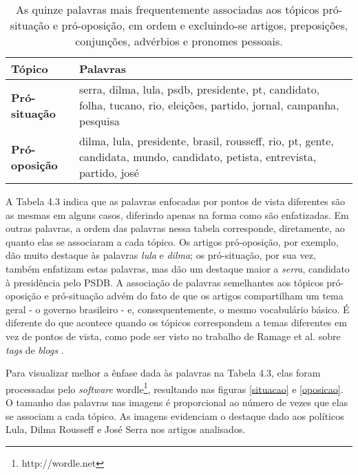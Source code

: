 \begin{table}[h]
\centering
\begin{tabular}{| l | p{10cm} | }
\hline
\textbf{Tópico} & \textbf{Palavras} \\ \hline
\textbf{Pró-situação} & serra, dilma, lula, psdb, presidente, pt, candidato, folha, tucano, rio, eleições, partido, jornal, campanha, pesquisa \\ \hline
\textbf{Pró-oposição} & dilma, lula, presidente, brasil, rousseff, rio, pt, gente, candidata, mundo, candidato, petista, entrevista, partido, josé \\ \hline
\end{tabular}
\label{tab:palavras}
\caption{As quinze palavras mais frequentemente associadas aos tópicos pró-situação e pró-oposição, em ordem e excluindo-se artigos, preposições, conjunções, advérbios e pronomes pessoais.}
\end{table}


A Tabela 4.3 indica que as palavras enfocadas por pontos de vista diferentes são as mesmas em alguns casos, diferindo apenas na forma como são enfatizadas. Em outras palavras, a ordem das palavras nessa tabela corresponde, diretamente, ao quanto elas se associaram a cada tópico. Os artigos pró-oposição, por exemplo, dão muito destaque às palavras \emph{lula} e \emph{dilma}; os pró-situação, por sua vez, também enfatizam estas palavras, mas dão um destaque maior a \emph{serra}, candidato à presidência pelo PSDB. A associação de palavras semelhantes aos tópicos pró-oposição e pró-situação advém do fato de que os artigos compartilham um tema geral - o governo brasileiro - e, consequentemente, o mesmo vocabulário básico. É diferente do que acontece quando os tópicos correspondem a temas diferentes em vez de pontos de vista, como pode ser visto no trabalho de Ramage et al. sobre \emph{tags} de \emph{blogs} \cite{llda}.

Para visualizar melhor a ênfase dada às palavras na Tabela 4.3, elas foram processadas pelo \emph{software} wordle\footnote{http://wordle.net}, resultando nas figuras \ref{situacao} e \ref{oposicao}. O tamanho das palavras nas imagens é proporcional ao número de vezes que elas se associam a cada tópico. As imagens evidenciam o destaque dado aos políticos Lula, Dilma Rousseff e José Serra nos artigos analisados. %

